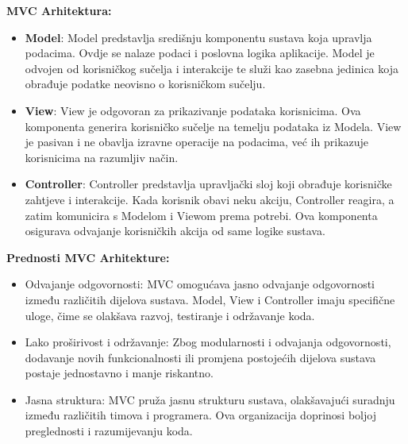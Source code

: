 \textbf{MVC Arhitektura:}

\begin{itemize}
    \item \textbf{Model}: Model predstavlja središnju komponentu sustava koja upravlja podacima. Ovdje se nalaze podaci i poslovna logika aplikacije. Model je odvojen od korisničkog sučelja i interakcije te služi kao zasebna jedinica koja obrađuje podatke neovisno o korisničkom sučelju.
    \item \textbf{View}: View je odgovoran za prikazivanje podataka korisnicima. Ova komponenta generira korisničko sučelje na temelju podataka iz Modela. View je pasivan i ne obavlja izravne operacije na podacima, već ih prikazuje korisnicima na razumljiv način.
    \item \textbf{Controller}: Controller predstavlja upravljački sloj koji obrađuje korisničke zahtjeve i interakcije. Kada korisnik obavi neku akciju, Controller reagira, a zatim komunicira s Modelom i Viewom prema potrebi. Ova komponenta osigurava odvajanje korisničkih akcija od same logike sustava.
\end{itemize}
 \textbf{
Prednosti MVC Arhitekture:}
\begin{itemize}
    \item Odvajanje odgovornosti: MVC omogućava jasno odvajanje odgovornosti između različitih dijelova sustava. Model, View i Controller imaju specifične uloge, čime se olakšava razvoj, testiranje i održavanje koda.
    \item Lako proširivost i održavanje: Zbog modularnosti i odvajanja odgovornosti, dodavanje novih funkcionalnosti ili promjena postojećih dijelova sustava postaje jednostavno i manje riskantno.
    \item Jasna struktura: MVC pruža jasnu strukturu sustava, olakšavajući suradnju između različitih timova i programera. Ova organizacija doprinosi boljoj preglednosti i razumijevanju koda.
\end{itemize}

 
